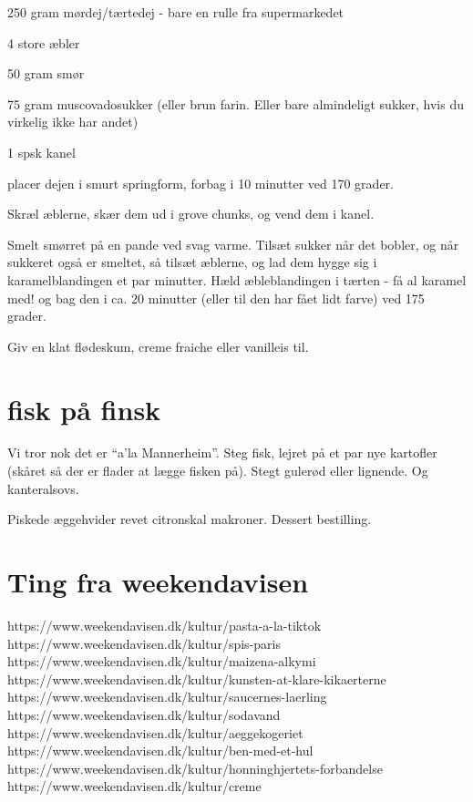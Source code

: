 \documentclass[
  letterpaper,
  DIV=11,
  numbers=noendperiod]{scrreprt}
\begin{document}
250 gram mørdej/tærtedej - bare en rulle fra supermarkedet

4 store æbler

50 gram smør

75 gram muscovadosukker (eller brun farin. Eller bare almindeligt
sukker, hvis du virkelig ikke har andet)

1 spsk kanel

placer dejen i smurt springform, forbag i 10 minutter ved 170 grader.

Skræl æblerne, skær dem ud i grove chunks, og vend dem i kanel.

Smelt smørret på en pande ved svag varme. Tilsæt sukker når det bobler,
og når sukkeret også er smeltet, så tilsæt æblerne, og lad dem hygge sig
i karamelblandingen et par minutter. Hæld æbleblandingen i tærten - få
al karamel med! og bag den i ca. 20 minutter (eller til den har fået
lidt farve) ved 175 grader.

Giv en klat flødeskum, creme fraiche eller vanilleis til.

\hypertarget{fisk-puxe5-finsk}{%
\section{fisk på finsk}\label{fisk-puxe5-finsk}}

Vi tror nok det er ``a'la Mannerheim''. Steg fisk, lejret på et par nye
kartofler (skåret så der er flader at lægge fisken på). Stegt gulerød
eller lignende. Og kanteralsovs.

Piskede æggehvider revet citronskal makroner. Dessert bestilling.

\hypertarget{ting-fra-weekendavisen}{%
\section{Ting fra weekendavisen}\label{ting-fra-weekendavisen}}

https://www.weekendavisen.dk/kultur/pasta-a-la-tiktok
https://www.weekendavisen.dk/kultur/spis-paris
https://www.weekendavisen.dk/kultur/maizena-alkymi
https://www.weekendavisen.dk/kultur/kunsten-at-klare-kikaerterne
https://www.weekendavisen.dk/kultur/saucernes-laerling
https://www.weekendavisen.dk/kultur/sodavand
https://www.weekendavisen.dk/kultur/aeggekogeriet
https://www.weekendavisen.dk/kultur/ben-med-et-hul
https://www.weekendavisen.dk/kultur/honninghjertets-forbandelse
https://www.weekendavisen.dk/kultur/creme
\end{document}
